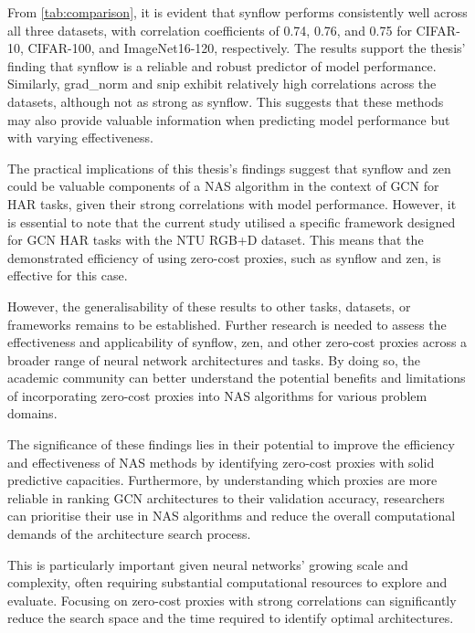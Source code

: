 From \cref{tab:comparison}, it is evident that \gls{synflow} performs consistently well across all three datasets, with correlation coefficients of 0.74, 0.76, and 0.75 for CIFAR-10, CIFAR-100, and ImageNet16-120, respectively. The results support the thesis' finding that \gls{synflow} is a reliable and robust predictor of model performance. Similarly, grad\_norm and \gls{snip} exhibit relatively high correlations across the datasets, although not as strong as \gls{synflow}. This suggests that these methods may also provide valuable information when predicting model performance but with varying effectiveness.

The practical implications of this thesis's findings suggest that \gls{synflow} and zen could be valuable components of a \gls{NAS} algorithm in the context of \gls{GCN} for \gls{HAR} tasks, given their strong correlations with model performance. However, it is essential to note that the current study utilised a specific framework designed for \gls{GCN} \gls{HAR} tasks with the NTU RGB+D dataset. This means that the demonstrated efficiency of using zero-cost proxies, such as \gls{synflow} and zen, is effective for this case.

However, the generalisability of these results to other tasks, datasets, or frameworks remains to be established. Further research is needed to assess the effectiveness and applicability of \gls{synflow}, zen, and other zero-cost proxies across a broader range of neural network architectures and tasks. By doing so, the academic community can better understand the potential benefits and limitations of incorporating zero-cost proxies into \gls{NAS} algorithms for various problem domains.  

The significance of these findings lies in their potential to improve the efficiency and effectiveness of \gls{NAS} methods by identifying zero-cost proxies with solid predictive capacities. Furthermore, by understanding which proxies are more reliable in ranking \gls{GCN} architectures to their validation accuracy, researchers can prioritise their use in \gls{NAS} algorithms and reduce the overall computational demands of the architecture search process.

This is particularly important given neural networks' growing scale and complexity, often requiring substantial computational resources to explore and evaluate. Focusing on zero-cost proxies with strong correlations can significantly reduce the search space and the time required to identify optimal architectures.

